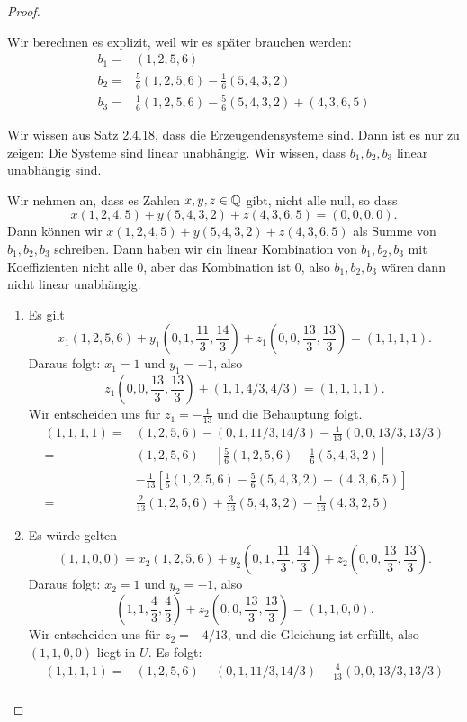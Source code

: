 \begin{proof}
\begin{parts}
	Wir berechnen es explizit, weil wir es später brauchen werden:
	\begin{align*}
		b_1=&(1,2,5,6)\\
		b_2=&\frac{5}{6}(1,2,5,6)-\frac{1}{6}(5,4,3,2)\\
		b_3=&\frac{1}{6}(1,2,5,6)-\frac{5}{6}(5,4,3,2)+(4,3,6,5)
	\end{align*}
\item Wir wissen aus Satz 2.4.18, dass die Erzeugendensysteme sind. Dann ist es nur zu zeigen: Die Systeme sind linear unabhängig. Wir wissen, dass $b_1,b_2,b_3$ linear unabhängig sind. 

	Wir nehmen an, dass es Zahlen $x,y,z\in \mathbb{Q}$ gibt, nicht alle null, so dass
	\[
	x(1,2,4,5)+y(5,4,3,2)+z(4,3,6,5)=(0,0,0,0)
	.\] 
	Dann können wir $x(1,2,4,5)+y(5,4,3,2)+z(4,3,6,5)$ als Summe von $b_1,b_2,b_3$ schreiben. Dann haben wir ein linear Kombination von $b_1,b_2,b_3$ mit Koeffizienten nicht alle 0, aber das Kombination ist $0$, also $b_1,b_2,b_3$ wären dann nicht linear unabhängig.
\item 
	\begin{enumerate}[label=(\arabic*)]
		\item Es gilt
			 \[
			x_1(1,2,5,6)+y_1(0,1,\frac{11}{3},\frac{14}{3})+z_1(0,0,\frac{13}{3},\frac{13}{3})=(1,1,1,1)
			.\] 
			Daraus folgt: $x_1=1$ und $y_1=-1$, also
			\[
			z_1(0,0,\frac{13}{3},\frac{13}{3})+(1,1,4 / 3, 4 / 3)=(1,1,1,1).\]
Wir entscheiden uns f\"{u}r $z_1=-\frac{1}{13}$ und die Behauptung folgt.
\begin{align*}
	(1,1,1,1)=&(1,2,5,6)-(0,1, 11 /3, 14 / 3)-\frac{1}{13}(0,0,13 / 3, 13 /3)\\
	=&(1,2,5,6)-\left[ \frac{5}{6}(1,2,5,6)-\frac{1}{6}(5,4,3,2) \right] \\
	 &-\frac{1}{13}\left[ \frac{1}{6}(1,2,5,6)-\frac{5}{6}(5,4,3,2)+(4,3,6,5) \right]\\
	=&\frac{2}{13}(1,2,5,6)+\frac{3}{13}(5,4,3,2)-\frac{1}{13}(4,3,2,5)
\end{align*}
\item Es würde gelten
	\[
		(1,1,0,0)=x_2(1,2,5,6)+y_2\left( 0,1,\frac{11}{3},\frac{14}{3} \right) +z_2\left( 0,0,\frac{13}{3},\frac{13}{3} \right) 
	.\] 
	Daraus folgt: $x_2=1$ und $y_2=-1$, also
	\[
		\left( 1,1,\frac{4}{3},\frac{4}{3} \right) +z_2\left( 0,0,\frac{13}{3},\frac{13}{3} \right) =(1,1,0,0)
	.\] 
	Wir entscheiden uns f\"{u}r $z_2=-4 / 13$, und die Gleichung ist erfüllt, also $(1,1,0,0)$ liegt in $U$. Es folgt:
	\begin{align*}
		(1,1,1,1)=&(1,2,5,6)-(0,1, 11 /3, 14 / 3)-\frac{4}{13}(0,0,13 / 3, 13 /3)\\

\end{align*}
\end{enumerate}
\end{parts}
\end{proof}
